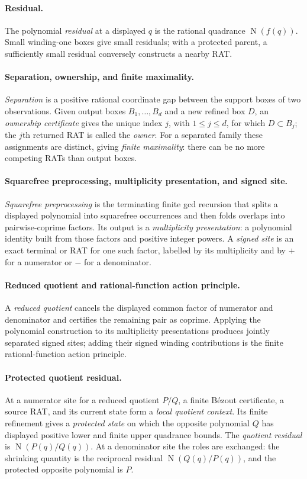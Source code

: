 \documentclass[11pt]{article}
\newcommand{\Norm}[1]{\operatorname{N}\!\left(#1\right)}
\begin{document}
\paragraph{Residual.}
The polynomial \emph{residual} at a displayed $q$ is the rational quadrance
$\Norm{f(q)}$.  Small winding-one boxes give small residuals; with a protected
parent, a sufficiently small residual conversely constructs a nearby RAT.

\paragraph{Separation, ownership, and finite maximality.}
\emph{Separation} is a positive rational coordinate gap between the support
boxes of two observations.  Given output boxes $B_1,\ldots,B_d$ and a new
refined box $D$, an \emph{ownership certificate} gives the unique index
$j$, with $1\le j\le d$, for which $D\subset B_j$; the $j$th returned RAT is
called the \emph{owner}.  For a separated family these assignments are
distinct, giving \emph{finite
maximality}: there can be no more competing RATs than output boxes.

\paragraph{Squarefree preprocessing, multiplicity presentation, and signed
site.}
\emph{Squarefree preprocessing} is the terminating finite gcd recursion that
splits a displayed polynomial into squarefree occurrences and then folds
overlaps into pairwise-coprime factors.  Its output is a \emph{multiplicity
presentation}: a polynomial identity built from those factors and positive
integer powers.  A \emph{signed site} is an exact terminal or RAT for one such
factor, labelled by its multiplicity and by $+$ for a numerator or $-$ for a
denominator.

\paragraph{Reduced quotient and rational-function action principle.}
A \emph{reduced quotient} cancels the displayed common factor of numerator
and denominator and certifies the remaining pair as coprime.  Applying the
polynomial construction to its multiplicity presentations produces jointly
separated signed sites; adding their signed winding contributions is the
finite rational-function action principle.

\paragraph{Protected quotient residual.}
At a numerator site for a reduced quotient $P/Q$, a finite B\'ezout
certificate, a source RAT, and its current state form a \emph{local quotient
context}.  Its finite refinement gives a \emph{protected state} on which the
opposite polynomial $Q$ has displayed positive lower and finite upper
quadrance bounds.  The \emph{quotient residual} is $\Norm{P(q)/Q(q)}$.  At a
denominator site the roles are exchanged: the shrinking quantity is the
reciprocal residual $\Norm{Q(q)/P(q)}$, and the protected opposite polynomial
is $P$.
\end{document}
